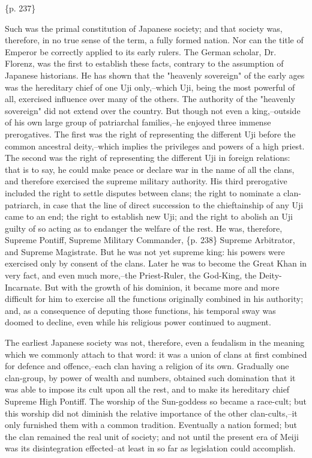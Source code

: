 \{p. 237\}

Such was the primal constitution of Japanese society; and that society was, therefore, in no true sense of the term, a fully formed nation. Nor can the title of Emperor be correctly applied to its early rulers. The German scholar, Dr. Florenz, was the first to establish these facts, contrary to the assumption of Japanese historians. He has shown that the "heavenly sovereign" of the early ages was the hereditary chief of one Uji only,--which Uji, being the most powerful of all, exercised influence over many of the others. The authority of the "heavenly sovereign" did not extend over the country. But though not even a king,--outside of his own large group of patriarchal families,--he enjoyed three immense prerogatives. The first was the right of representing the different Uji before the common ancestral deity,--which implies the privileges and powers of a high priest. The second was the right of representing the different Uji in foreign relations: that is to say, he could make peace or declare war in the name of all the clans, and therefore exercised the supreme military authority. His third prerogative included the right to settle disputes between clans; the right to nominate a clan-patriarch, in case that the line of direct succession to the chieftainship of any Uji came to an end; the right to establish new Uji; and the right to abolish an Uji guilty of so acting as to endanger the welfare of the rest. He was, therefore, Supreme Pontiff, Supreme Military Commander, \{p. 238\} Supreme Arbitrator, and Supreme Magistrate. But he was not yet supreme king: his powers were exercised only by consent of the clans. Later he was to become the Great Khan in very fact, and even much more,--the Priest-Ruler, the God-King, the Deity-Incarnate. But with the growth of his dominion, it became more and more difficult for him to exercise all the functions originally combined in his authority; and, as a consequence of deputing those functions, his temporal sway was doomed to decline, even while his religious power continued to augment.

The earliest Japanese society was not, therefore, even a feudalism in the meaning which we commonly attach to that word: it was a union of clans at first combined for defence and offence,--each clan having a religion of its own. Gradually one clan-group, by power of wealth and numbers, obtained such domination that it was able to impose its cult upon all the rest, and to make its hereditary chief Supreme High Pontiff. The worship of the Sun-goddess so became a race-cult; but this worship did not diminish the relative importance of the other clan-cults,--it only furnished them with a common tradition. Eventually a nation formed; but the clan remained the real unit of society; and not until the present era of Meiji was its disintegration effected--at least in so far as legislation could accomplish.

